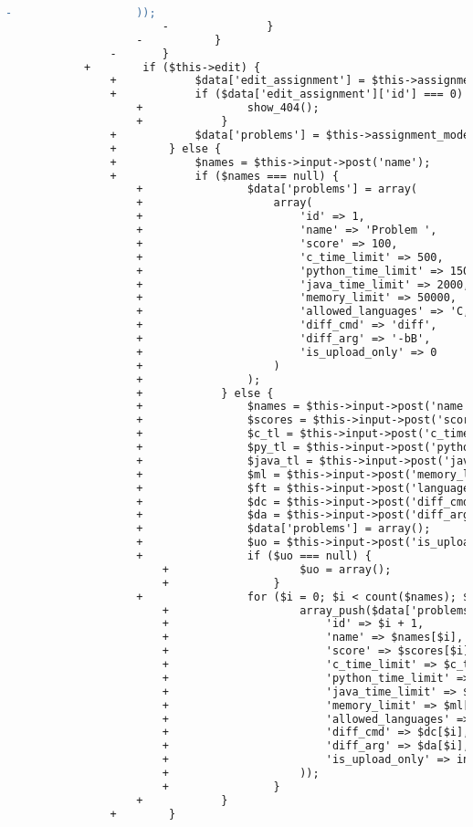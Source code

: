 \begin{lstlisting}[language=diff, caption=Perubahan pada kode Assignments.php]
						-					));
						-				}
					-			}
				-		}
			+        if ($this->edit) {
				+            $data['edit_assignment'] = $this->assignment_model->assignment_info($this->edit_assignment);
				+            if ($data['edit_assignment']['id'] === 0) {
					+                show_404();
					+            }
				+            $data['problems'] = $this->assignment_model->all_problems($this->edit_assignment);
				+        } else {
				+            $names = $this->input->post('name');
				+            if ($names === null) {
					+                $data['problems'] = array(
					+                    array(
					+                        'id' => 1,
					+                        'name' => 'Problem ',
					+                        'score' => 100,
					+                        'c_time_limit' => 500,
					+                        'python_time_limit' => 1500,
					+                        'java_time_limit' => 2000,
					+                        'memory_limit' => 50000,
					+                        'allowed_languages' => 'C,C++,Python 2,Python 3,Java',
					+                        'diff_cmd' => 'diff',
					+                        'diff_arg' => '-bB',
					+                        'is_upload_only' => 0
					+                    )
					+                );
					+            } else {
					+                $names = $this->input->post('name');
					+                $scores = $this->input->post('score');
					+                $c_tl = $this->input->post('c_time_limit');
					+                $py_tl = $this->input->post('python_time_limit');
					+                $java_tl = $this->input->post('java_time_limit');
					+                $ml = $this->input->post('memory_limit');
					+                $ft = $this->input->post('languages');
					+                $dc = $this->input->post('diff_cmd');
					+                $da = $this->input->post('diff_arg');
					+                $data['problems'] = array();
					+                $uo = $this->input->post('is_upload_only');
					+                if ($uo === null) {
						+                    $uo = array();
						+                }
					+                for ($i = 0; $i < count($names); $i++) {
						+                    array_push($data['problems'], array(
						+                        'id' => $i + 1,
						+                        'name' => $names[$i],
						+                        'score' => $scores[$i],
						+                        'c_time_limit' => $c_tl[$i],
						+                        'python_time_limit' => $py_tl[$i],
						+                        'java_time_limit' => $java_tl[$i],
						+                        'memory_limit' => $ml[$i],
						+                        'allowed_languages' => $ft[$i],
						+                        'diff_cmd' => $dc[$i],
						+                        'diff_arg' => $da[$i],
						+                        'is_upload_only' => in_array($i + 1, $uo) ? 1 : 0,
						+                    ));
						+                }
					+            }
				+        }
			

\end{lstlisting}
